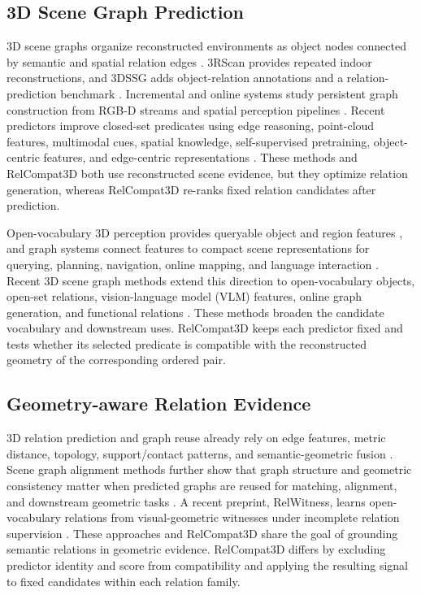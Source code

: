 \subsection{3D Scene Graph Prediction}
3D scene graphs organize reconstructed environments as object nodes connected by semantic and spatial relation edges \cite{armeni20193d}.
3RScan provides repeated indoor reconstructions, and 3DSSG adds object-relation annotations and a relation-prediction benchmark \cite{wald2019rio,wald2020learning}. Incremental and online systems study persistent graph construction from RGB-D streams and spatial perception pipelines \cite{wu2021scenegraphfusion,hughes2022hydra}. Recent predictors improve closed-set predicates using edge reasoning, point-cloud features, multimodal cues, spatial knowledge, self-supervised pretraining, object-centric features, and edge-centric representations \cite{zhang2021exploiting,feng20233d,wang2023vl,koch2024sgrec3d,heo2026object,ma2026edge}. These methods and RelCompat3D both use reconstructed scene evidence, but they optimize relation generation, whereas RelCompat3D re-ranks fixed relation candidates after prediction.

Open-vocabulary 3D perception provides queryable object and region features \cite{peng2023openscene,takmaz2023openmask3d}, and graph systems connect features to compact scene representations for querying, planning, navigation, online mapping, and language interaction \cite{gu2024conceptgraphs,werby2024hierarchical,maggio2024clio}. Recent 3D scene graph methods extend this direction to open-vocabulary objects, open-set relations, vision-language model (VLM) features, online graph generation, and functional relations \cite{koch2024open3dsg,chen2024clip,hou2025fross,zhang2025open,wang2025open}. These methods broaden the candidate vocabulary and downstream uses. RelCompat3D keeps each predictor fixed and tests whether its selected predicate is compatible with the reconstructed geometry of the corresponding ordered pair. 

\subsection{Geometry-aware Relation Evidence}
3D relation prediction and graph reuse already rely on edge features, metric distance, topology, support/contact patterns, and semantic-geometric fusion \cite{zhang2021exploiting,feng20233d,xie2024sg,huang2025fireplace,shao2025great,sarkar2023sgaligner}. Scene graph alignment methods further show that graph structure and geometric consistency matter when predicted graphs are reused for matching, alignment, and downstream geometric tasks \cite{sarkar2023sgaligner, xie2024sg}. A recent preprint, RelWitness, learns open-vocabulary relations from visual-geometric witnesses under incomplete relation supervision \cite{nguyen2026relwitness}. These approaches and RelCompat3D share the goal of grounding semantic relations in geometric evidence. RelCompat3D differs by excluding predictor identity and score from compatibility and applying the resulting signal to fixed candidates within each relation family. 

